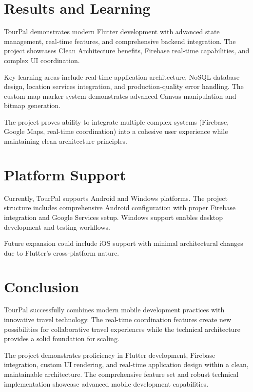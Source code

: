 \documentclass[12pt,a4paper]{article}
\begin{document}
\section{Results and Learning}

TourPal demonstrates modern Flutter development with advanced state management, real-time features, and comprehensive backend integration. The project showcases Clean Architecture benefits, Firebase real-time capabilities, and complex UI coordination.

Key learning areas include real-time application architecture, NoSQL database design, location services integration, and production-quality error handling. The custom map marker system demonstrates advanced Canvas manipulation and bitmap generation.

The project proves ability to integrate multiple complex systems (Firebase, Google Maps, real-time coordination) into a cohesive user experience while maintaining clean architecture principles.

\section{Platform Support}

Currently, TourPal supports Android and Windows platforms. The project structure includes comprehensive Android configuration with proper Firebase integration and Google Services setup. Windows support enables desktop development and testing workflows.

Future expansion could include iOS support with minimal architectural changes due to Flutter's cross-platform nature.

\section{Conclusion}

TourPal successfully combines modern mobile development practices with innovative travel technology. The real-time coordination features create new possibilities for collaborative travel experiences while the technical architecture provides a solid foundation for scaling.

The project demonstrates proficiency in Flutter development, Firebase integration, custom UI rendering, and real-time application design within a clean, maintainable architecture. The comprehensive feature set and robust technical implementation showcase advanced mobile development capabilities.
\end{document}
